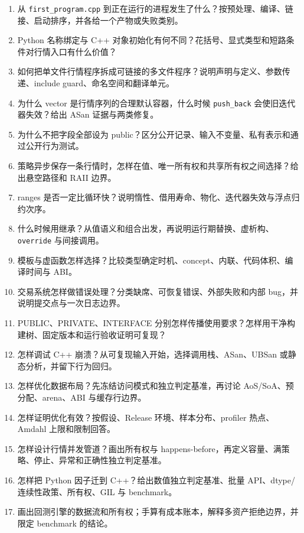 \begin{enumerate}
  \item 从 \texttt{first\_program.cpp} 到正在运行的进程发生了什么？按预处理、编译、链接、启动排序，并各给一个产物或失败类别。
  \item Python 名称绑定与 C++ 对象初始化有何不同？花括号、显式类型和短路条件对行情入口有什么价值？
  \item 如何把单文件行情程序拆成可链接的多文件程序？说明声明与定义、参数传递、include guard、命名空间和翻译单元。
  \item 为什么 vector 是行情序列的合理默认容器，什么时候 \texttt{push\_back} 会使旧迭代器失效？给出 ASan 证据与两类修复。
  \item 为什么不把字段全部设为 public？区分公开记录、输入不变量、私有表示和通过公开行为测试。
  \item 策略异步保存一条行情时，怎样在值、唯一所有权和共享所有权之间选择？给出悬空路径和 RAII 边界。
  \item ranges 是否一定比循环快？说明惰性、借用寿命、物化、迭代器失效与浮点归约次序。
  \item 什么时候用继承？从值语义和组合出发，再说明运行期替换、虚析构、\texttt{override} 与间接调用。
  \item 模板与虚函数怎样选择？比较类型确定时机、concept、内联、代码体积、编译时间与 ABI。
  \item 交易系统怎样做错误处理？分类缺席、可恢复错误、外部失败和内部 bug，并说明提交点与一次日志边界。
  \item PUBLIC、PRIVATE、INTERFACE 分别怎样传播使用要求？怎样用干净构建树、固定版本和运行验收证明可复现？
  \item 怎样调试 C++ 崩溃？从可复现输入开始，选择调用栈、ASan、UBSan 或静态分析，并留下行为回归。
  \item 怎样优化数据布局？先冻结访问模式和独立判定基准，再讨论 AoS/SoA、预分配、arena、ABI 与缓存行边界。
  \item 怎样证明优化有效？按假设、Release 环境、样本分布、profiler 热点、Amdahl 上限和限制回答。
  \item 怎样设计行情并发管道？画出所有权与 happens-before，再定义容量、满策略、停止、异常和正确性独立判定基准。
  \item 怎样把 Python 因子迁到 C++？给出数值独立判定基准、批量 API、dtype/连续性政策、所有权、GIL 与 benchmark。
  \item 画出回测引擎的数据流和所有权；手算有成本账本，解释多资产拒绝边界，并限定 benchmark 的结论。
\end{enumerate}

